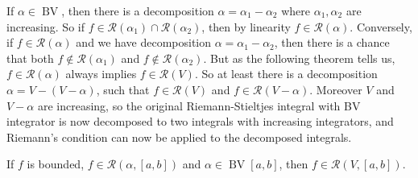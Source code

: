 \documentclass{article}
\newcommand{\Riemann}{\mathcal R}
\DeclareMathOperator{\BV}{BV}
\begin{document}
If $ \alpha \in \BV $, then there is a decomposition $ \alpha = \alpha_1 - \alpha_2 $ where $ \alpha_1, \alpha_2 $ are increasing. So if $ f \in \Riemann(\alpha_1) \cap \Riemann(\alpha_2) $, then by linearity $ f \in \Riemann(\alpha) $. Conversely, if $ f \in \Riemann(\alpha) $ and we have decomposition $ \alpha = \alpha_1 - \alpha_2 $, then there is a chance that both $ f \not\in\Riemann(\alpha_1) $ and $ f \not\in \Riemann(\alpha_2) $. But as the following theorem tells us, $ f \in \Riemann(\alpha) $ always implies $ f \in \Riemann(V) $. So at least there is a decomposition $ \alpha = V - (V - \alpha) $, such that $ f \in \Riemann(V) $ and $ f \in \Riemann(V - \alpha) $. Moreover $ V $ and $ V - \alpha $ are increasing, so the original Riemann-Stieltjes integral with BV integrator is now decomposed to two integrals with increasing integrators, and Riemann's condition can now be applied to the decomposed integrals.

\begin{theorem}
    If $ f $ is bounded, $ f \in \Riemann(\alpha, [a, b]) $ and $ \alpha \in \BV[a, b] $, then $ f \in \Riemann(V, [a, b]) $.
\end{theorem}
\end{document}
